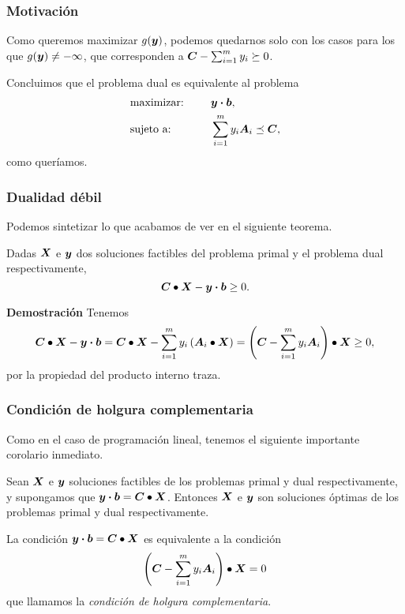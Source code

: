\documentclass[aspectratio=169,12pt,spanish]{beamer}
\begin{document}

\begin{frame}
\frametitle{Motivación}

Como queremos maximizar $g(\bm{y})$, podemos quedarnos solo con los casos para los que $g(\bm{y}) \neq -\infty$, que corresponden a $\bm{C} - \sum_{i=1}^m y_i \succeq 0$.

Concluimos que el problema dual es equivalente al problema
\begin{alignat*}{2}
  & \text{maximizar: }  & \quad & \bm{y} \boldsymbol{\cdot} \bm{b},   \\
   & \text{sujeto a: } & \quad & \sum_{i=1}^m y_i \bm{A}_i  \preceq \bm{C},
\end{alignat*}
como queríamos.

\end{frame}


\begin{frame}
\frametitle{Dualidad débil}

Podemos sintetizar lo que acabamos de ver en el siguiente teorema.

\begin{theorem}
  Dadas $\bm{X}$ e $\bm{y}$ dos soluciones factibles del problema primal y el problema dual respectivamente,
  $$\bm{C} \bullet \bm{X} - \bm{y} \boldsymbol{\cdot} \bm{b} \ge 0.$$
\end{theorem}

\textbf{Demostración}
Tenemos
  $$\bm{C} \bullet \bm{X} - \bm{y} \boldsymbol{\cdot} \bm{b} = \bm{C} \bullet \bm{X} -  \sum_{i=1}^m y_i \left(\bm{A}_i \bullet \bm{X}\right) =
   \left(\bm{C} - \sum_{i=1}^m y_i \bm{A}_i\right) \bullet \bm{X} \ge 0,
   $$
  por la propiedad del producto interno traza.


\end{frame}


\begin{frame}
\frametitle{Condición de holgura complementaria}

Como en el caso de programación lineal, tenemos el siguiente importante corolario inmediato.

\begin{corollary}
Sean $\bm{X}$ e $\bm{y}$ soluciones factibles de los problemas primal y dual respectivamente, y supongamos que $\bm{y} \boldsymbol{\cdot} \bm{b} = \bm{C} \bullet \bm{X}$. Entonces $\bm{X}$ e $\bm{y}$ son soluciones óptimas de los problemas primal y dual respectivamente.
\end{corollary}

La condición $\bm{y} \boldsymbol{\cdot} \bm{b} = \bm{C} \bullet \bm{X}$ es equivalente a la condición
$$
\left(\bm{C} - \sum_{i=1}^m y_i \bm{A}_i\right) \bullet \bm{X} = 0
$$
que llamamos la \emph{condición de holgura complementaria}.

\end{frame}
\end{document}
